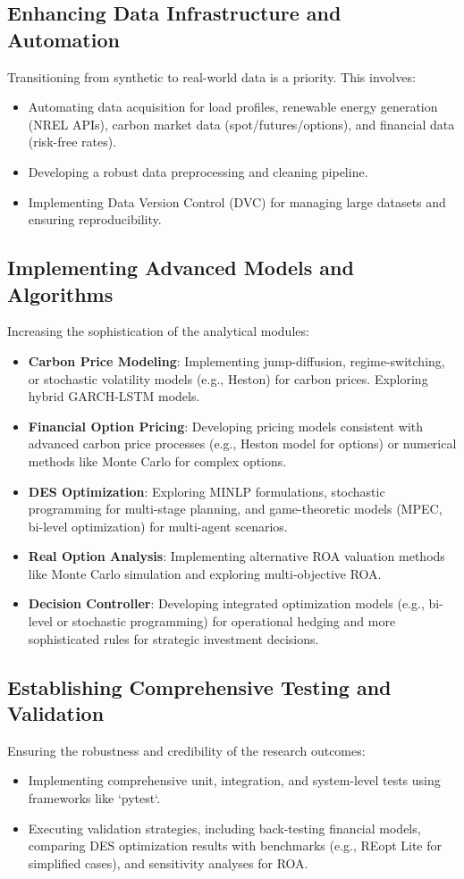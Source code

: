 \subsection{Enhancing Data Infrastructure and Automation}
Transitioning from synthetic to real-world data is a priority. This involves:
\begin{itemize}
    \item Automating data acquisition for load profiles, renewable energy generation (NREL APIs), carbon market data (spot/futures/options), and financial data (risk-free rates).
    \item Developing a robust data preprocessing and cleaning pipeline.
    \item Implementing Data Version Control (DVC) for managing large datasets and ensuring reproducibility.
\end{itemize}

\subsection{Implementing Advanced Models and Algorithms}
Increasing the sophistication of the analytical modules:
\begin{itemize}
    \item \textbf{Carbon Price Modeling}: Implementing jump-diffusion, regime-switching, or stochastic volatility models (e.g., Heston) for carbon prices. Exploring hybrid GARCH-LSTM models.
    \item \textbf{Financial Option Pricing}: Developing pricing models consistent with advanced carbon price processes (e.g., Heston model for options) or numerical methods like Monte Carlo for complex options.
    \item \textbf{DES Optimization}: Exploring MINLP formulations, stochastic programming for multi-stage planning, and game-theoretic models (MPEC, bi-level optimization) for multi-agent scenarios.
    \item \textbf{Real Option Analysis}: Implementing alternative ROA valuation methods like Monte Carlo simulation and exploring multi-objective ROA.
    \item \textbf{Decision Controller}: Developing integrated optimization models (e.g., bi-level or stochastic programming) for operational hedging and more sophisticated rules for strategic investment decisions.
\end{itemize}

\subsection{Establishing Comprehensive Testing and Validation}
Ensuring the robustness and credibility of the research outcomes:
\begin{itemize}
    \item Implementing comprehensive unit, integration, and system-level tests using frameworks like `pytest`.
    \item Executing validation strategies, including back-testing financial models, comparing DES optimization results with benchmarks (e.g., REopt Lite for simplified cases), and sensitivity analyses for ROA.
\end{itemize}

